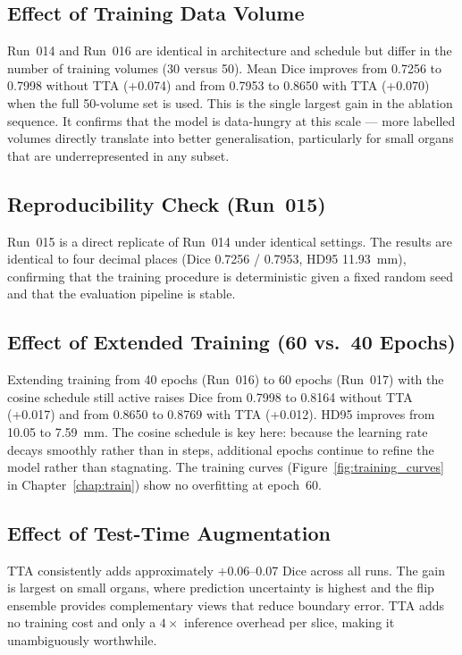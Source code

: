 \FloatBarrier

\subsection{Effect of Training Data Volume}

Run~014 and Run~016 are identical in architecture and schedule but differ in the number of
training volumes (30 versus 50). Mean Dice improves from 0.7256 to 0.7998 without TTA
(+0.074) and from 0.7953 to 0.8650 with TTA (+0.070) when the full 50-volume set is used.
This is the single largest gain in the ablation sequence. It confirms that the model is data-hungry
at this scale --- more labelled volumes directly translate into better generalisation, particularly
for small organs that are underrepresented in any subset.

\subsection{Reproducibility Check (Run~015)}

Run~015 is a direct replicate of Run~014 under identical settings. The results are identical
to four decimal places (Dice 0.7256 / 0.7953, HD95 11.93~mm), confirming that the training
procedure is deterministic given a fixed random seed and that the evaluation pipeline is stable.

\subsection{Effect of Extended Training (60 vs.\ 40 Epochs)}

Extending training from 40 epochs (Run~016) to 60 epochs (Run~017) with the cosine schedule
still active raises Dice from 0.7998 to 0.8164 without TTA (+0.017) and from 0.8650 to 0.8769
with TTA (+0.012). HD95 improves from 10.05 to 7.59~mm. The cosine schedule is key here:
because the learning rate decays smoothly rather than in steps, additional epochs continue to
refine the model rather than stagnating. The training curves (Figure~\ref{fig:training_curves}
in Chapter~\ref{chap:train}) show no overfitting at epoch~60.

\subsection{Effect of Test-Time Augmentation}

TTA consistently adds approximately $+$0.06--0.07 Dice across all runs. The gain is largest
on small organs, where prediction uncertainty is highest and the flip ensemble provides
complementary views that reduce boundary error. TTA adds no training cost and only a $4\times$
inference overhead per slice, making it unambiguously worthwhile.

